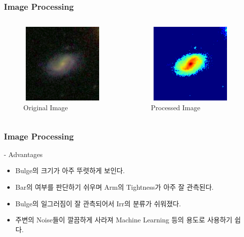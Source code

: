 \documentclass[xcolor={dvipsnames,table}]{beamer}
\begin{document}
\begin{frame}
 \frametitle{Image Processing}
 
 \begin{columns}[t]
   \begin{figure}
    \centering
    \includegraphics[width=6cm, height=4cm]{Test90.png}
    \caption{Original Image }
   \end{figure}
   \begin{figure}
    \centering
    \includegraphics[width=6cm, height=4cm]{Conv90.png}
    \caption{Processed Image}
   \end{figure}
  \end{columns}

\end{frame}

\begin{frame}
  \frametitle{Image Processing}
  
  - Advantages
  \begin{itemize}
   \item Bulge의 크기가 아주 뚜렷하게 보인다.
   \item Bar의 여부를 판단하기 쉬우며 Arm의 Tightness가 아주 잘 관측된다.
   \item Bulge의 일그러짐이 잘 관측되어서 Irr의 분류가 쉬워졌다.
   \item 주변의 Noise들이 깔끔하게 사라져 Machine Learning 등의 용도로 사용하기 쉽다.
  \end{itemize}

\end{frame}
\end{document}
